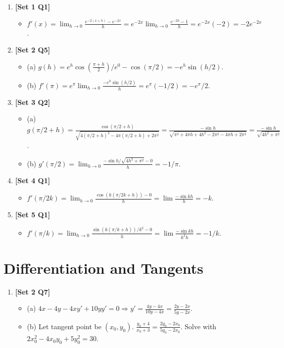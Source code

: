 \documentclass[12pt, a4paper]{article} %
\begin{document}
\begin{enumerate}
    \item \textbf{[Set 1 Q1]}
    \begin{itemize}
        \item $f'(x) = \lim_{h \to 0} \frac{e^{-2(x+h)} - e^{-2x}}{h} = e^{-2x} \lim_{h \to 0} \frac{e^{-2h}-1}{h} = e^{-2x}(-2) = -2e^{-2x}$.
    \end{itemize}

    \item \textbf{[Set 2 Q5]}
    \begin{itemize}
        \item (a) $g(h) = e^h \cos(\frac{\pi+h}{2}) / e^0 - \cos(\pi/2) = -e^h \sin(h/2)$.
        \item (b) $f'(\pi) = e^\pi \lim_{h \to 0} \frac{-e^h \sin(h/2)}{h} = e^\pi (-1/2) = -e^\pi/2$.
    \end{itemize}

    \item \textbf{[Set 3 Q2]}
    \begin{itemize}
        \item (a) $g(\pi/2+h) = \frac{\cos(\pi/2+h)}{\sqrt{4(\pi/2+h)^2 - 4\pi(\pi/2+h) + 2\pi^2}} = \frac{-\sin h}{\sqrt{\pi^2+4\pi h+4h^2 - 2\pi^2-4\pi h + 2\pi^2}} = \frac{-\sin h}{\sqrt{4h^2+\pi^2}}$.
        \item (b) $g'(\pi/2) = \lim_{h \to 0} \frac{-\sin h / \sqrt{4h^2+\pi^2} - 0}{h} = -1/\pi$.
    \end{itemize}

    \item \textbf{[Set 4 Q1]}
    \begin{itemize}
        \item $f'(\pi/2k) = \lim_{h \to 0} \frac{\cos(k(\pi/2k+h)) - 0}{h} = \lim \frac{-\sin kh}{h} = -k$.
    \end{itemize}

    \item \textbf{[Set 5 Q1]}
    \begin{itemize}
        \item $f'(\pi/k) = \lim_{h \to 0} \frac{\sin(k(\pi/k+h))/k^2 - 0}{h} = \lim \frac{-\sin kh}{k^2 h} = -1/k$.
    \end{itemize}
\end{enumerate}

\section{Differentiation and Tangents}
\begin{enumerate}
    \item \textbf{[Set 2 Q7]}
    \begin{itemize}
        \item (a) $4x - 4y - 4x y' + 10y y' = 0 \Rightarrow y' = \frac{4y-4x}{10y-4x} = \frac{2y-2x}{5y-2x}$.
        \item (b) Let tangent point be $(x_0, y_0)$. $\frac{y_0+4}{x_0+3} = \frac{2y_0-2x_0}{5y_0-2x_0}$. Solve with $2x_0^2 - 4x_0y_0 + 5y_0^2 = 30$.
    \end{itemize}
\end{enumerate}
\end{document}
